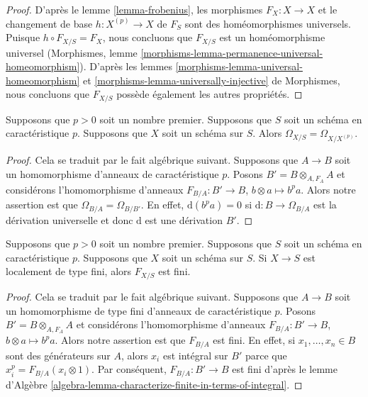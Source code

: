 \begin{proof}
D'après le lemme \ref{lemma-frobenius}, les morphismes $F_X : X
\to X$ et le changement de base $h : X^{(p)} \to X$ de $F_S$ sont
des homéomorphismes universels. Puisque $h \circ F_{X/S} = F_X$,
nous concluons que $F_{X/S}$ est un homéomorphisme universel
(Morphismes, lemme
\ref{morphisms-lemma-permanence-universal-homeomorphism}). D'après les lemmes
\ref{morphisms-lemma-universal-homeomorphism} et
\ref{morphisms-lemma-universally-injective} de Morphismes, nous concluons que $F_{X/S}$ possède également les autres propriétés.
\end{proof}

\begin{lemma}
\label{lemma-relative-frobenius-omega}
Supposons que $p > 0$ soit un nombre premier. Supposons que $S$ soit un schéma en
caractéristique $p$. Supposons que $X$ soit un schéma sur $S$. Alors $\Omega_{X/S} = \Omega_{X/X^{(p)}}$.
\end{lemma}

\begin{proof}
Cela se traduit par le fait algébrique suivant. Supposons
que $A \to B$ soit un homomorphisme d'anneaux de
caractéristique $p$. Posons $B' = B \otimes_{A, F_A} A$ et
considérons l'homomorphisme d'anneaux $F_{B/A} : B' \to B$,
$b \otimes a \mapsto b^pa$. Alors notre assertion est que
$\Omega_{B/A} = \Omega_{B/B'}$. En effet,
$\text{d}(b^pa) = 0$ si $\text{d} : B \to \Omega_{B/A}$ est la
dérivation universelle et donc $\text{d}$ est une dérivation $B'$.
\end{proof}

\begin{lemma}
\label{lemma-relative-frobenius-finite}
Supposons que $p > 0$ soit un nombre premier. Supposons que $S$ soit un
schéma en caractéristique $p$. Supposons que $X$ soit un schéma sur
$S$. Si $X \to S$ est localement de type fini, alors $F_{X/S}$ est fini.
\end{lemma}

\begin{proof}
Cela se traduit par le fait algébrique suivant. Supposons que $A
\to B$ soit un homomorphisme de type fini d'anneaux de
caractéristique $p$. Posons $B' = B \otimes_{A, F_A} A$ et
considérons l'homomorphisme d'anneaux $F_{B/A} : B' \to B$, $b
\otimes a \mapsto b^pa$. Alors notre assertion est que $F_{B/A}$ est
fini. En effet, si $x_1, \ldots, x_n \in B$ sont des générateurs sur
$A$, alors $x_i$ est intégral sur $B'$ parce que $x_i^p = F_{B/A}(x_i
\otimes 1)$. Par conséquent, $F_{B/A} : B' \to B$ est fini d'après le
lemme d'Algèbre \ref{algebra-lemma-characterize-finite-in-terms-of-integral}.
\end{proof}

